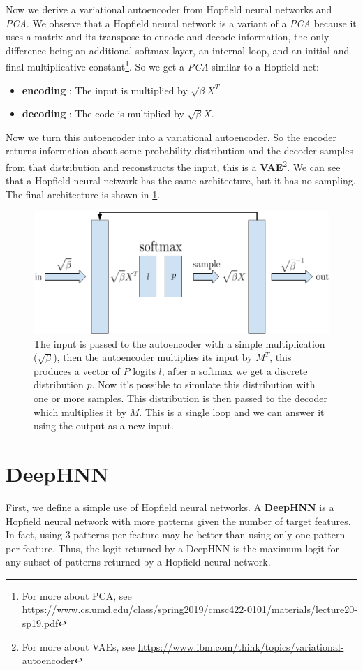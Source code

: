 \noindent Now we derive a variational autoencoder from Hopfield neural networks and \textit{PCA}. We observe that a Hopfield neural network is a variant of a \textit{PCA} because it uses a matrix and its transpose to encode and decode information, the only difference being an additional softmax layer, an internal loop, and an initial and final multiplicative constant\footnote{For more about PCA, see \url{https://www.cs.umd.edu/class/spring2019/cmsc422-0101/materials/lecture20-sp19.pdf}}. So we get a \textit{PCA} similar to a Hopfield net:
\begin{itemize}
    \item \textbf{encoding} : The input is multiplied by $\sqrt{\beta}X^T$.
    \item \textbf{decoding} : The code is multiplied by $\sqrt{\beta}X$.
\end{itemize}
Now we turn this autoencoder into a variational autoencoder. So the encoder returns information about some probability distribution and the decoder samples from that distribution and reconstructs the input, this is a \textbf{VAE}\footnote{For more about VAEs, see \url{https://www.ibm.com/think/topics/variational-autoencoder}}. We can see that a Hopfield neural network has the same architecture, but it has no sampling. The final architecture is shown in \cref{fig:VAE}.
\begin{figure}[htbp]
    \centering
    \includegraphics[width=0.9\linewidth]{Figures/VAE.png}
    \caption{The input is passed to the autoencoder with a simple multiplication ($\sqrt{\beta}$), then the autoencoder multiplies its input by $M^T$, this produces a vector of $P$ logits $l$, after a softmax we get a discrete distribution $p$. Now it's possible to simulate this distribution with one or more samples. This distribution is then passed to the decoder which multiplies it by $M$. This is a single loop and we can answer it using the output as a new input.}
    \label{fig:VAE}
\end{figure}

\section{DeepHNN}
First, we define a simple use of Hopfield neural networks. A \textbf{DeepHNN} is a Hopfield neural network with more patterns given the number of target features. In fact, using $3$ patterns per feature may be better than using only one pattern per feature. Thus, the logit returned by a DeepHNN is the maximum logit for any subset of patterns returned by a Hopfield neural network.

